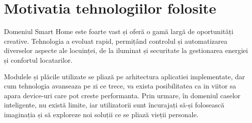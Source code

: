 \section{Motivatia tehnologiilor folosite}

Domeniul Smart Home este foarte vast și oferă o gamă largă de oportunități creative. Tehnologia a evoluat rapid, permițând controlul și automatizarea diverselor aspecte ale locuinței, de la iluminat și securitate la gestionarea energiei și confortul locatarilor. 

Modulele și plăcile utilizate se pliază pe arhitectura aplicatiei implementate, dar cum tehnologia avanseaza pe zi ce trece, va exista posibilitatea ca in viitor sa apara device-uri care pot creste performanta. Prin urmare, în domeniul caselor inteligente, nu există limite, iar utilizatorii sunt încurajați să-și folosească imaginația și să exploreze noi soluții ce se pliază vieții personale.